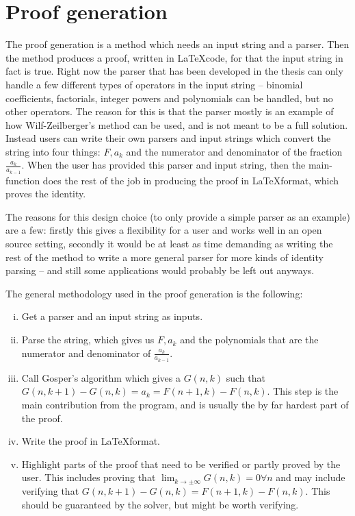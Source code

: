 \section{Proof generation}
The proof generation is a method which needs an input string and a parser. Then the method produces a proof, written in \LaTeX code, for that the input string in fact is true. Right now the parser that has been developed in the thesis can only handle a few different types of operators in the input string -- binomial coefficients, factorials, integer powers and polynomials can be handled, but no other operators. The reason for this is that the parser mostly is an example of how Wilf-Zeilberger's method can be used, and is not meant to be a full solution. Instead users can write their own parsers and input strings which convert the string into four things: $F,a_k$ and the numerator and denominator of the fraction $\frac{a_k}{a_{k-1}}$. When the user has provided this parser and input string, then the main-function does the rest of the job in producing the proof in \LaTeX format, which proves the identity.

The reasons for this design choice (to only provide a simple parser as an example) are a few: firstly this gives a flexibility for a user and works well in an open source setting, secondly it would be at least as time demanding as writing the rest of the method to write a more general parser for more kinds of identity parsing -- and still some applications would probably be left out anyways.

The general methodology used in the proof generation is the following:
\begin{enumerate}[i)]
  \item Get a parser and an input string as inputs.
  \item Parse the string, which gives us $F,a_k$ and the polynomials that are the numerator and denominator of $\frac{a_k}{a_{k-1}}$.
  \item Call Gosper's algorithm which gives a $G(n,k)$ such that $G(n,k+1)-G(n,k)=a_k=F(n+1,k)-F(n,k)$. This step is the main contribution from the program, and is usually the by far hardest part of the proof.
  \item Write the proof in \LaTeX format.
  \item Highlight parts of the proof that need to be verified or partly proved by the user. This includes proving that $\lim_{k\to\pm\infty}G(n,k)=0\forall n$ and may include verifying that $G(n,k+1)-G(n,k)=F(n+1,k)-F(n,k)$. This should be guaranteed by the solver, but might be worth verifying.
\end{enumerate}
